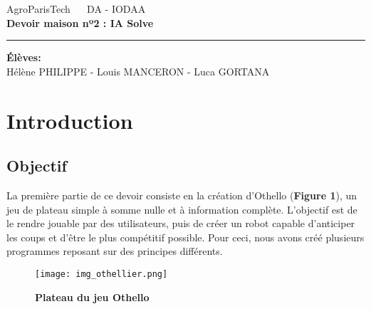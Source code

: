 \documentclass{article}
\begin{document}
\date{Novembre 2022}

\begin{center}
\large
AgroParisTech ~~  DA - IODAA  \medskip\\ 
\vspace{0.3cm}
\Large
{\bf Devoir maison nº2 : IA Solve}
\vspace{0.4cm}
\small
\end{center}
\hrule

\noindent

\vspace{0.2cm}

\begin{center}
\textbf{Élèves:}\\
Hélène PHILIPPE - Louis MANCERON - Luca GORTANA \\
\end{center}

\section{Introduction} 

\subsection{Objectif}
La première partie de ce devoir consiste en la création d'Othello (\textbf{Figure 1}), un jeu de plateau simple à somme nulle et à information complète. L'objectif est de le rendre jouable par des utilisateurs, puis de créer un robot capable d'anticiper les coups et d'être le plus compétitif possible. Pour ceci, nous avons créé plusieurs programmes reposant sur des principes différents.

\begin{figure}[!h]
\centering
\texttt{[image: img\_othellier.png]}
\caption{\textbf{Plateau du jeu Othello}}
\label{fig1}
\end{figure}
\end{document}
